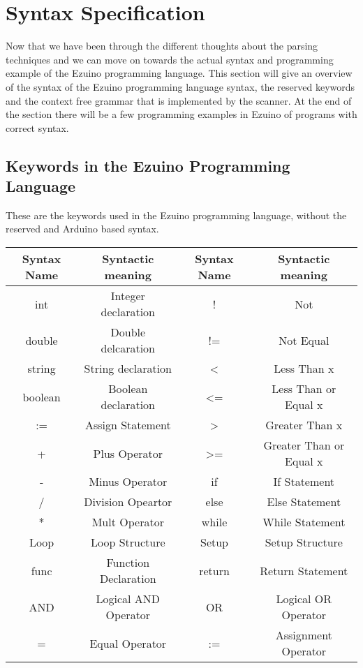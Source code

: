 \section{Syntax Specification}
Now that we have been through the different thoughts about the parsing techniques and we can move on towards the actual syntax and programming example of the Ezuino programming language.
This section will give an overview of the syntax of the Ezuino programming language syntax, the reserved keywords and the context free grammar that is implemented by the scanner. At the end of the section there will be a few programming examples in Ezuino of programs with correct syntax.
\subsection{Keywords in the Ezuino Programming Language}
These are the keywords used in the Ezuino programming language, without the reserved and Arduino based syntax.
\begin{table}[H]
\begin{tabular}{|c|c|c|c|}
\hline
\textbf{Syntax Name} & \textbf{Syntactic meaning}      & \textbf{Syntax Name} & \textbf{Syntactic meaning}         \\ \hline
int                  & Integer declaration  & !                    & Not                     \\ \hline
double               & Double delcaration   & !=                   & Not Equal               \\ \hline
string               & String declaration   & \textless{}          & Less Than x             \\ \hline
boolean              & Boolean declaration  & \textless{}=         & Less Than or Equal x    \\ \hline
:=                   & Assign Statement     & \textgreater{}       & Greater Than x          \\ \hline
+                    & Plus Operator        & \textgreater{}=      & Greater Than or Equal x \\ \hline
-                    & Minus Operator       & if                   & If Statement            \\ \hline
/                    & Division Opeartor    & else                 & Else Statement          \\ \hline
*                    & Mult Operator        & while                & While Statement         \\ \hline
Loop                 & Loop Structure       & Setup                & Setup Structure         \\ \hline
func                 & Function Declaration & return               & Return Statement        \\ \hline
AND                  & Logical AND Operator & OR                   & Logical OR Operator     \\ \hline
=                    & Equal Operator       & :=                   & Assignment Operator    \\ \hline


\end{tabular}
\end{table}
